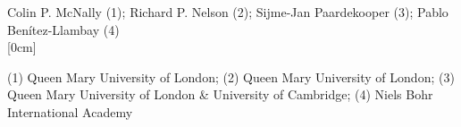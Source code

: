\documentclass[a4paper,11pt]{book}
\begin{document}
\begin{center}
{\large Colin P. McNally (1)};{ \large  Richard P. Nelson (2)};{ \large  Sijme-Jan Paardekooper (3)};{ \large  Pablo Benítez-Llambay (4)}\\



[0cm]



   
  
\vspace{2 mm}
\noindent (1) Queen Mary University of London; (2)  Queen Mary University of London; (3)  Queen Mary University of London \& University of Cambridge; (4)  Niels Bohr International Academy \\

\end{center}



  
\end{document}
